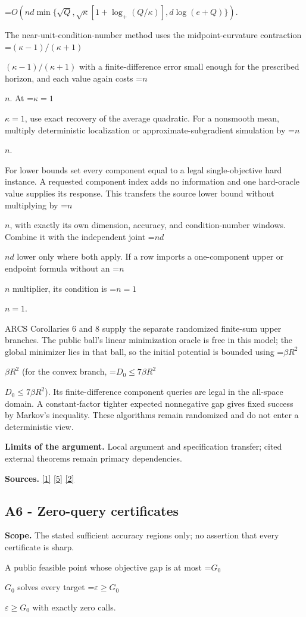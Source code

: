\documentclass[10pt,a4paper]{article}
\newcommand{\AtlasMath}[1]{\par\begingroup\centering\setbox0=\hbox{$\displaystyle #1$}\ifdim\wd0>1.4\linewidth\typeout{ATLAS WIDE FORMULA: \the\wd0}\fi\ifdim\wd0>\linewidth\resizebox{\linewidth}{!}{\box0}\else\box0\fi\par\endgroup}
\newcommand{\AtlasInlineMath}[1]{\begingroup\setbox0=\hbox{$#1$}\ifdim\wd0>.4\linewidth\endgroup\AtlasMath{#1}\else\endgroup$#1$\fi}
\begin{document}
\AtlasMath{O\!\left(nd\min\{\sqrt Q,\sqrt\kappa[1+\log_+(Q/\kappa)],d\log(e+Q)\}\right).}

The near-unit-condition-number method uses the midpoint-curvature contraction \AtlasInlineMath{(\kappa-1)/(\kappa+1)} with a finite-difference error small enough for the prescribed horizon, and each value again costs \AtlasInlineMath{n}. At \AtlasInlineMath{\kappa=1}, use exact recovery of the average quadratic. For a nonsmooth mean, multiply deterministic localization or approximate-subgradient simulation by \AtlasInlineMath{n}.

For lower bounds set every component equal to a legal single-objective hard instance. A requested component index adds no information and one hard-oracle value supplies its response. This transfers the source lower bound without multiplying by \AtlasInlineMath{n}, with exactly its own dimension, accuracy, and condition-number windows. Combine it with the independent joint \AtlasInlineMath{nd} lower only where both apply. If a row imports a one-component upper or endpoint formula without an \AtlasInlineMath{n} multiplier, its condition is \AtlasInlineMath{n=1}.

ARCS Corollaries 6 and 8 supply the separate randomized finite-sum upper branches. The public ball's linear minimization oracle is free in this model; the global minimizer lies in that ball, so the initial potential is bounded using \AtlasInlineMath{\beta R^2} (for the convex branch, \AtlasInlineMath{D_0\le7\beta R^2}). Its finite-difference component queries are legal in the all-space domain. A constant-factor tighter expected nonnegative gap gives fixed success by Markov's inequality. These algorithms remain randomized and do not enter a deterministic view.

\textbf{Limits of the argument.} Local argument and specification transfer; cited external theorems remain primary dependencies.

\textbf{Sources.} \href{https://arxiv.org/html/2610.00345v1}{[1]} \href{https://arxiv.org/abs/2109.08858}{[5]} \href{https://arxiv.org/html/2607.16558v2}{[2]}

\subsection{A6 - Zero-query certificates}
\textbf{Scope.} The stated sufficient accuracy regions only; no assertion that every certificate is sharp.

A public feasible point whose objective gap is at most \AtlasInlineMath{G_0} solves every target \AtlasInlineMath{\varepsilon\ge G_0} with exactly zero calls.
\end{document}
